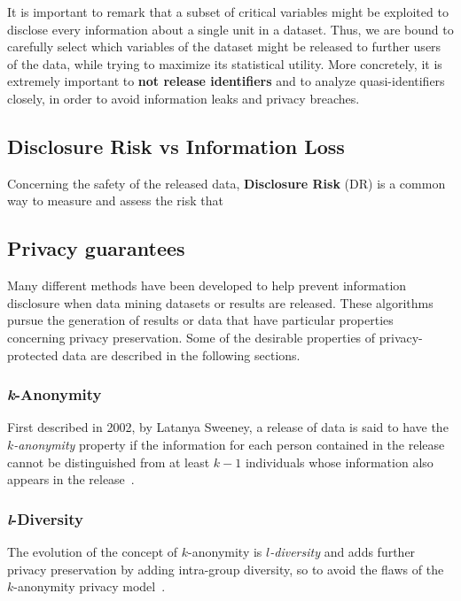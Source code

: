 It is important to remark that a subset of critical variables might be exploited to disclose every information about a single unit in a dataset. Thus, we are bound to carefully select which variables of the dataset might be released to further users of the data, while trying to maximize its statistical utility. More concretely, it is extremely important to \textbf{not release identifiers} and to analyze quasi-identifiers closely, in order to avoid information leaks and privacy breaches.

\subsection{Disclosure Risk vs Information Loss}
\label{Theory::SDC::DiscRiskInfoLoss}

Concerning the safety of the released data, \textbf{Disclosure Risk} (DR) is a common way to measure and assess the risk that 

\subsection{Privacy guarantees}
\label{Theory::SDC::Guarantees}


Many different methods have been developed to help prevent information disclosure when data mining datasets or results are released. These algorithms pursue the generation of results or data that have particular properties concerning privacy preservation. Some of the desirable properties of privacy-protected data are described in the following sections.

\subsubsection{\textit{k}-Anonymity}

First described in 2002, by Latanya Sweeney, a release of data is said to have the \textit{$k$-anonymity} property if the information for each person contained in the release cannot be distinguished from at least $k-1$ individuals whose information also appears in the release~\citep{Sweeney:kAnonymity}.

\subsubsection{\textit{l}-Diversity}

The evolution of the concept of $k$-anonymity is \textit{$l$-diversity} and adds further privacy preservation by adding intra-group diversity, so to avoid the flaws of the $k$-anonymity privacy model~\citep{Machanavajjhala:lDiversity}.

